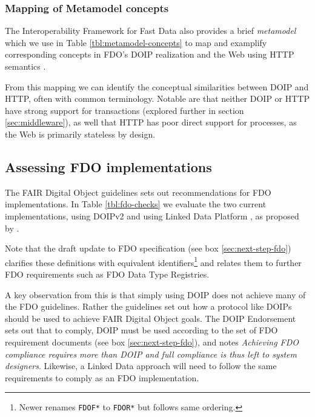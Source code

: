 \documentclass[fleqn,10pt,lineno]{wlpeerjlua}
\begin{document}
\hypertarget{mapping-of-metamodel-concepts}{%
\subsubsection*{Mapping of Metamodel concepts}\label{mapping-of-metamodel-concepts}}

The Interoperability Framework for Fast Data also provides a brief \emph{metamodel} which we use in Table \ref{tbl:metamodel-concepts} to map and examplify corresponding concepts in FDO's DOIP realization and the Web using HTTP semantics \cite{8HJqcF1Q}.



From this mapping we can identify the conceptual similarities between DOIP and HTTP, often with common terminology. Notable are that neither DOIP or HTTP have strong support for transactions (explored further in section \ref{sec:middleware}), as well that HTTP has poor direct support for processes, as the Web is primarily stateless by design.

\hypertarget{sec:doip-fdo-compare}{%
\subsection*{Assessing FDO implementations}\label{sec:doip-fdo-compare}}

The FAIR Digital Object guidelines \cite{RwvirqWg} sets out recommendations for FDO implementations. In Table \ref{tbl:fdo-checks} we evaluate the two current implementations, using DOIPv2 \cite{13TcbsZF6} and using Linked Data Platform \cite{17OHlMRQA}, as proposed by \cite{7szz7dwO}.



Note that the draft update to FDO specification \cite{yygVPoL0} (see box \ref{sec:next-step-fdo}) clarifies these definitions with equivalent identifiers\footnote{Newer \cite{yygVPoL0} renames \texttt{FDOF*} to \texttt{FDOR*} but follows same ordering.} and relates them to further FDO requirements such as FDO Data Type Registries.

A key observation from this is that simply using DOIP does not achieve many of the FDO guidelines. Rather the guidelines set out how a protocol like DOIPs should be used to achieve FAIR Digital Object goals. The DOIP Endorsement \cite{15yGpJ0wh} sets out that to comply, DOIP must be used according to the set of FDO requirement documents (see box \ref{sec:next-step-fdo}), and notes \emph{Achieving FDO compliance requires more than DOIP and full compliance is thus left to system designers}. Likewise, a Linked Data approach will need to follow the same requirements to comply as an FDO implementation.
\end{document}

